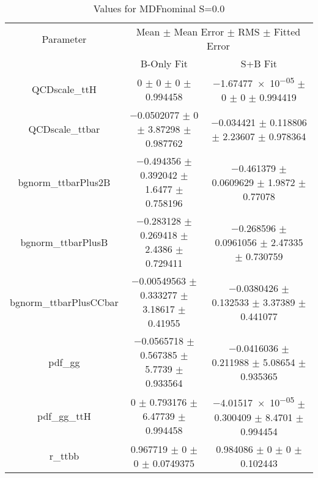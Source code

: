 \begin{table}
\centering
\caption{Values for MDFnominal S=0.0}
\begin{tabular}{ccc}
\toprule
Parameter & \multicolumn{2}{c}{Mean $\pm$ Mean Error $\pm$ RMS $\pm$ Fitted Error}\\
 & B-Only Fit & S+B Fit\\
\midrule
QCDscale\_ttH & \num{0} $\pm$ \num{0} $\pm$ \num{0} $\pm$ \num{0.994458} & \num{-1.67477e-05} $\pm$ \num{0} $\pm$ \num{0} $\pm$ \num{0.994419}\\
QCDscale\_ttbar & \num{-0.0502077} $\pm$ \num{0} $\pm$ \num{3.87298} $\pm$ \num{0.987762} & \num{-0.034421} $\pm$ \num{0.118806} $\pm$ \num{2.23607} $\pm$ \num{0.978364}\\
bgnorm\_ttbarPlus2B & \num{-0.494356} $\pm$ \num{0.392042} $\pm$ \num{1.6477} $\pm$ \num{0.758196} & \num{-0.461379} $\pm$ \num{0.0609629} $\pm$ \num{1.9872} $\pm$ \num{0.77078}\\
bgnorm\_ttbarPlusB & \num{-0.283128} $\pm$ \num{0.269418} $\pm$ \num{2.4386} $\pm$ \num{0.729411} & \num{-0.268596} $\pm$ \num{0.0961056} $\pm$ \num{2.47335} $\pm$ \num{0.730759}\\
bgnorm\_ttbarPlusCCbar & \num{-0.00549563} $\pm$ \num{0.333277} $\pm$ \num{3.18617} $\pm$ \num{0.41955} & \num{-0.0380426} $\pm$ \num{0.132533} $\pm$ \num{3.37389} $\pm$ \num{0.441077}\\
pdf\_gg & \num{-0.0565718} $\pm$ \num{0.567385} $\pm$ \num{5.7739} $\pm$ \num{0.933564} & \num{-0.0416036} $\pm$ \num{0.211988} $\pm$ \num{5.08654} $\pm$ \num{0.935365}\\
pdf\_gg\_ttH & \num{0} $\pm$ \num{0.793176} $\pm$ \num{6.47739} $\pm$ \num{0.994458} & \num{-4.01517e-05} $\pm$ \num{0.300409} $\pm$ \num{8.4701} $\pm$ \num{0.994454}\\
r\_ttbb & \num{0.967719} $\pm$ \num{0} $\pm$ \num{0} $\pm$ \num{0.0749375} & \num{0.984086} $\pm$ \num{0} $\pm$ \num{0} $\pm$ \num{0.102443}\\
\bottomrule
\end{tabular}
\end{table}